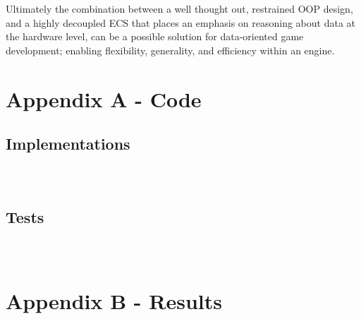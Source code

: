 \documentclass[10pt]{scrartcl}
\begin{document}
Ultimately the combination between a well thought out, restrained OOP design, and a highly decoupled ECS that places an emphasis on reasoning about data at the hardware level, can be a possible solution for data-oriented game development; enabling flexibility, generality, and efficiency within an engine.

\printbibliography

\appendix

\section{Appendix A - Code} %
\label{sec:appendix_a_code}

\setcounter{listing}{0}

\subsection{Implementations} %
\label{sub:implementations}
\inputminted[bgcolor=backcode,style=native,breaklines=true]{cpp}{code/entity.cpp}

\inputminted[bgcolor=backcode,style=native,breaklines=true]{cpp}{code/componentdata.cpp}

\inputminted[bgcolor=backcode,style=native,breaklines=true]{cpp}{code/entitymap.cpp}

\subsection{Tests} %
\label{sub:tests}
\inputminted[bgcolor=backcode,style=native,breaklines=true]{cpp}{code/testsystems.cpp}

\inputminted[bgcolor=backcode,style=native,breaklines=true]{cpp}{code/Main.cpp}

\inputminted[bgcolor=backcode,style=native,breaklines=true]{cpp}{code/EntityTests.cpp}

\section{Appendix B - Results} %
\label{sec:appendix_b_results}
\setcounter{figure}{0}
\end{document}
